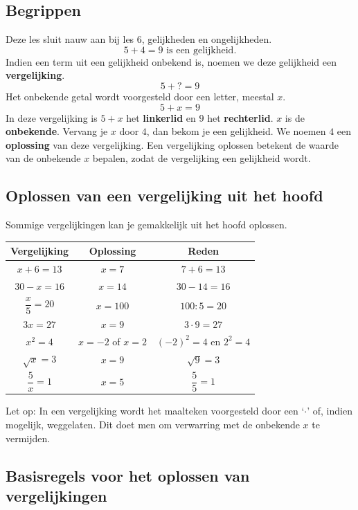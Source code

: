 \documentclass{bis}
\begin{document}


\subsection{Begrippen}

Deze les sluit nauw aan bij les 6, gelijkheden en ongelijkheden.
\[5 + 4 = 9 \text{ is een gelijkheid.}\]
Indien een term uit een gelijkheid onbekend is, noemen we deze gelijkheid een {\bf vergelijking}.
\[5 + ? = 9\]
Het onbekende getal wordt voorgesteld door een letter, meestal $x$.
\[5 + x = 9\]
In deze vergelijking is $5 + x$ het {\bf linkerlid} en $9$ het {\bf rechterlid}.
$x$ is de {\bf onbekende}.
Vervang je $x$ door $4$, dan bekom je een gelijkheid. We noemen $4$ een {\bf oplossing} van deze vergelijking.
Een vergelijking oplossen betekent de waarde van de onbekende $x$ bepalen, zodat de vergelijking een gelijkheid wordt.

\subsection{Oplossen van een vergelijking uit het hoofd}

Sommige vergelijkingen kan je gemakkelijk uit het hoofd oplossen.

\begin{voorbeeld*}
\begin{center}
  \begin{tabular}{c|c|c}
  Vergelijking & Oplossing & Reden\\
  \hline
  $x+6 = 13$ & $x=7$ & $7+6=13$\\
  $30 - x = 16$ &	$x = 14$ & $30 - 14 = 16$\\
  $\dfrac{x}{5} = 20$ & $x = 100$	& $100 : 5 = 20$\\
  $3x = 27$	& $x = 9$	&	$3\cdot 9 = 27$\\
  $x^2=4$ & $x=-2$ of $x=2$ & $(-2)^2=4$ en $2^2=4$\\
  $\sqrt{x}=3$ & $x=9$ & $\sqrt{9}=3$\\
  $\dfrac{5}{x}=1$ & $x=5$ & $\dfrac{5}{5}=1$
  \end{tabular}
\end{center}
\end{voorbeeld*}

Let op: In een vergelijking wordt het maalteken voorgesteld door een ‘$\cdot$’ of, indien mogelijk, weggelaten. Dit doet men om verwarring met de onbekende $x$ te vermijden.

\subsection{Basisregels voor het oplossen van vergelijkingen}
\end{document}
